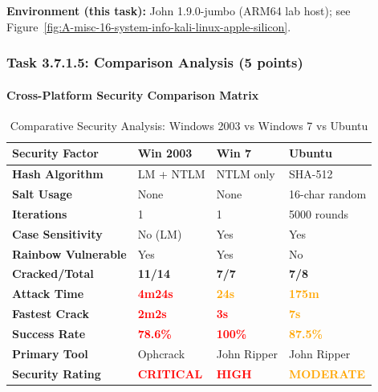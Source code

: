 \noindent\textbf{Environment (this task):} John 1.9.0-jumbo (ARM64 lab host); see Figure~\ref{fig:A-misc-16-system-info-kali-linux-apple-silicon}.



\subsubsection{Task 3.7.1.5: Comparison Analysis (5 points)}


\paragraph{Cross-Platform Security Comparison Matrix}

\begin{table}[H]
\centering
\label{tab:security-comparison}
\caption{Comparative Security Analysis: Windows 2003 vs Windows 7 vs Ubuntu}
\begin{tabularx}{\columnwidth}{@{}L{2.5cm}C{2.5cm}C{2.5cm}C{2.5cm}@{}}
\toprule
\textbf{Security Factor} & \textbf{Win 2003} & \textbf{Win 7} & \textbf{Ubuntu} \\
\midrule
{}
\textbf{Hash Algorithm} & LM + NTLM & NTLM only & SHA-512 \\
\textbf{Salt Usage} & None & None & 16-char random \\
\textbf{Iterations} & 1 & 1 & 5000 rounds \\
\textbf{Case Sensitivity} & No (LM) & Yes & Yes \\
\textbf{Rainbow Vulnerable} & Yes & Yes & No \\
\textbf{Cracked/Total} & \textbf{11/14} & \textbf{7/7} & \textbf{7/8} \\
\textbf{Attack Time} & \textcolor{red}{\textbf{4m24s}} & \textcolor{orange}{\textbf{24s}} & \textcolor{orange}{\textbf{175m}} \\
\textbf{Fastest Crack} & \textcolor{red}{\textbf{2m2s}} & \textcolor{red}{\textbf{3s}} & \textcolor{orange}{\textbf{7s}} \\
\textbf{Success Rate} & \textcolor{red}{\textbf{78.6\%}} & \textcolor{red}{\textbf{100\%}} & \textcolor{orange}{\textbf{87.5\%}} \\
\textbf{Primary Tool} & Ophcrack & John Ripper & John Ripper \\
\textbf{Security Rating} & \textcolor{red}{\textbf{CRITICAL}} & \textcolor{red}{\textbf{HIGH}} & \textcolor{orange}{\textbf{MODERATE}} \\
\bottomrule
\end{tabularx}
\end{table}

